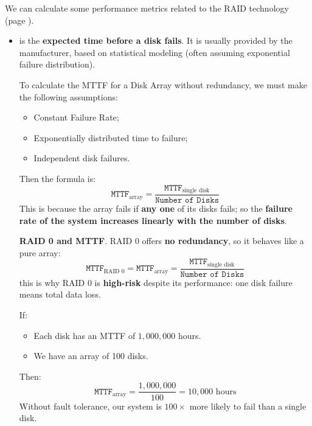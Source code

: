 We can calculate some performance metrics related to the RAID technology (page \pageref{paragraph: RAID}).
\begin{itemize}
    \item {} is the \textbf{expected time before a disk fails}. It is usually provided by the manufacturer, based on statistical modeling (often assuming exponential failure distribution).
    
    To calculate the MTTF for a Disk Array without redundancy, we must make the following assumptions:
    \begin{itemize}
        \item Constant Failure Rate;
        \item Exponentially distributed time to failure;
        \item Independent disk failures.
    \end{itemize}
    Then the formula is:
    \begin{equation}
        \texttt{MTTF}_{\text{array}} = \dfrac{\texttt{MTTF}_{\text{single disk}}}{\texttt{Number of Disks}}
    \end{equation}
    This is because the array fails if \textbf{any one} of its disks fails; so the \textbf{failure rate of the system increases linearly with the number of disks}.

    \textcolor{Red2}{ \textbf{RAID 0 and MTTF}}. RAID 0 offers \textbf{no redundancy}, so it behaves like a pure array:
    \begin{equation}
        \texttt{MTTF}_{\text{RAID 0}} = \texttt{MTTF}_{\text{array}} = \dfrac{\texttt{MTTF}_{\text{single disk}}}{\texttt{Number of Disks}}
    \end{equation}
    this is why RAID 0 is \textbf{high-risk} despite its performance: one disk failure means total data loss.

    \begin{examplebox}[: MTTF]
        If:
        \begin{itemize}
            \item Each disk has an MTTF of $1,000,000$ hours.
            \item We have an array of 100 disks.
        \end{itemize}
        Then:
        \begin{equation*}
            \texttt{MTTF}_{\text{array}} = \dfrac{1,000,000}{100} = 10,000 \text{ hours}
        \end{equation*}
        Without fault tolerance, our system is $100\times$ more likely to fail than a single disk.
    \end{examplebox}


\end{itemize}
